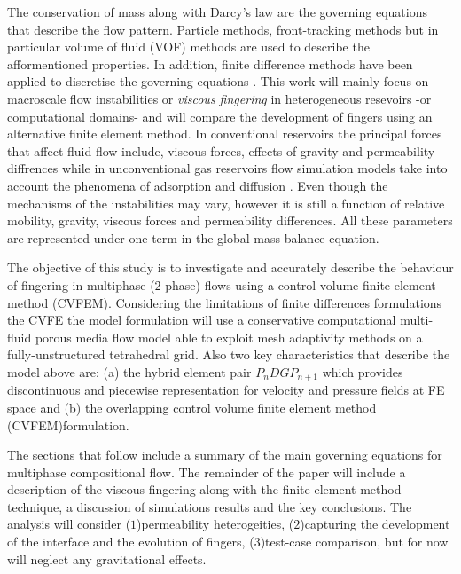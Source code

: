 \documentclass[preprint,authoryear,12pt]{elsarticle}
\begin{document}
\medskip
The conservation of mass along with Darcy's law are the governing equations that describe the flow pattern. Particle methods, front-tracking methods \citep{univerdi_1992} but in particular volume of fluid (VOF) methods \citep{hirt_1981,rider_1998} are used to describe the afformentioned properties. In addition, finite difference methods have been applied to discretise the governing equations \citep{Luo2016,Moortgat2016,Hoteit2008}. This work will mainly focus on macroscale flow instabilities or \textit{viscous fingering} in heterogeneous resevoirs -or computational domains- and will compare the development of fingers using an alternative finite element method. 
In conventional reservoirs the principal forces that affect fluid flow include, viscous forces, effects of gravity and permeability diffrences while in unconventional gas reservoirs flow simulation models take into account the phenomena of adsorption and diffusion \citep{abdus_2015}. Even though the mechanisms of the instabilities may vary, however it is still a function of relative mobility, gravity, viscous forces and permeability differences. All these parameters are represented under one term in the global mass balance equation.   

\medskip
The objective of this study is to investigate and accurately describe the behaviour of fingering in multiphase ($2$-phase) flows using a control volume finite element method (CVFEM). Considering the limitations of finite differences formulations the CVFE the model formulation will use a conservative computational multi-fluid porous media flow model able to exploit mesh adaptivity methods on a fully-unstructured tetrahedral grid. Also two key characteristics that describe the model above are: (a) the hybrid element pair $P_{n}DGP_{n+1}$ which provides discontinuous and piecewise representation for velocity and pressure fields at FE space and (b) the overlapping control volume finite element method (CVFEM)formulation.

\medskip
The sections that follow include a summary of the main governing equations for multiphase compositional flow. The remainder of the paper will include a description of the viscous fingering along with the finite element method technique, a discussion of simulations results and the key conclusions. The analysis will consider ($1$)permeability heterogeities, ($2$)capturing the development of the interface and the evolution of fingers, ($3$)test-case comparison, but for now will neglect any gravitational effects. 
\end{document}
